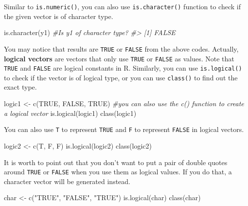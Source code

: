 \documentclass[
]{book}
\newenvironment{Shaded}{\begin{snugshade}}{\end{snugshade}}
\newcommand{\CommentTok}[1]{\textcolor[rgb]{0.56,0.35,0.01}{\textit{#1}}}
\newcommand{\ConstantTok}[1]{\textcolor[rgb]{0.00,0.00,0.00}{#1}}
\newcommand{\FunctionTok}[1]{\textcolor[rgb]{0.00,0.00,0.00}{#1}}
\newcommand{\NormalTok}[1]{#1}
\newcommand{\OtherTok}[1]{\textcolor[rgb]{0.56,0.35,0.01}{#1}}
\newcommand{\StringTok}[1]{\textcolor[rgb]{0.31,0.60,0.02}{#1}}
\begin{document}
Similar to \texttt{is.numeric()}, you can also use \texttt{is.character()} function to check if the given vector is of character type.

\begin{Shaded}
\begin{Highlighting}[]
\FunctionTok{is.character}\NormalTok{(y1) }\CommentTok{\#Is y1 of character type?}
\CommentTok{\#\textgreater{} [1] FALSE}
\end{Highlighting}
\end{Shaded}

You may notice that results are \texttt{TRUE} or \texttt{FALSE} from the above codes. Actually, \textbf{logical vectors} are vectors that only use \texttt{TRUE} or \texttt{FALSE} as values. Note that \texttt{TRUE} and \texttt{FALSE} are logical constants in R. Similarly, you can use \texttt{is.logical()} to check if the vector is of logical type, or you can use \texttt{class()} to find out the exact type.

\begin{Shaded}
\begin{Highlighting}[]
\NormalTok{logic1 }\OtherTok{\textless{}{-}} \FunctionTok{c}\NormalTok{(}\ConstantTok{TRUE}\NormalTok{, }\ConstantTok{FALSE}\NormalTok{, }\ConstantTok{TRUE}\NormalTok{) }\CommentTok{\#you can also use the c() function to create a logical vector}
\FunctionTok{is.logical}\NormalTok{(logic1)}
\FunctionTok{class}\NormalTok{(logic1)}
\end{Highlighting}
\end{Shaded}

You can also use \texttt{T} to represent \texttt{TRUE} and \texttt{F} to represent \texttt{FALSE} in logical vectors.

\begin{Shaded}
\begin{Highlighting}[]
\NormalTok{logic2 }\OtherTok{\textless{}{-}} \FunctionTok{c}\NormalTok{(T, F, F)}
\FunctionTok{is.logical}\NormalTok{(logic2)}
\FunctionTok{class}\NormalTok{(logic2)}
\end{Highlighting}
\end{Shaded}

It is worth to point out that you don't want to put a pair of double quotes around \texttt{TRUE} or \texttt{FALSE} when you use them as logical values. If you do that, a character vector will be generated instead.

\begin{Shaded}
\begin{Highlighting}[]
\NormalTok{char }\OtherTok{\textless{}{-}} \FunctionTok{c}\NormalTok{(}\StringTok{"TRUE"}\NormalTok{, }\StringTok{"FALSE"}\NormalTok{, }\StringTok{"TRUE"}\NormalTok{)}
\FunctionTok{is.logical}\NormalTok{(char)}
\FunctionTok{class}\NormalTok{(char)}
\end{Highlighting}
\end{Shaded}
\end{document}
